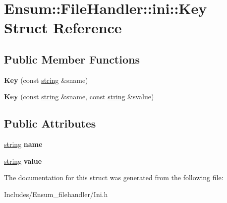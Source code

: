 \hypertarget{struct_ensum_1_1_file_handler_1_1ini_1_1_key}{}\section{Ensum\+:\+:File\+Handler\+:\+:ini\+:\+:Key Struct Reference}
\label{struct_ensum_1_1_file_handler_1_1ini_1_1_key}
\subsection*{Public Member Functions}
\begin{DoxyCompactItemize}
\item 
{\bfseries Key} (const \hyperlink{class_ensum_1_1string}{string} \&sname)\hypertarget{struct_ensum_1_1_file_handler_1_1ini_1_1_key_a10016f664c9ccb85aa8d382efac16794}{}\label{struct_ensum_1_1_file_handler_1_1ini_1_1_key_a10016f664c9ccb85aa8d382efac16794}

\item 
{\bfseries Key} (const \hyperlink{class_ensum_1_1string}{string} \&sname, const \hyperlink{class_ensum_1_1string}{string} \&svalue)\hypertarget{struct_ensum_1_1_file_handler_1_1ini_1_1_key_a8485c52051e07255bdc2f9ddb68ada91}{}\label{struct_ensum_1_1_file_handler_1_1ini_1_1_key_a8485c52051e07255bdc2f9ddb68ada91}

\end{DoxyCompactItemize}
\subsection*{Public Attributes}
\begin{DoxyCompactItemize}
\item 
\hyperlink{class_ensum_1_1string}{string} {\bfseries name}\hypertarget{struct_ensum_1_1_file_handler_1_1ini_1_1_key_a9307efc046f4e0d2dde327ae9c33221b}{}\label{struct_ensum_1_1_file_handler_1_1ini_1_1_key_a9307efc046f4e0d2dde327ae9c33221b}

\item 
\hyperlink{class_ensum_1_1string}{string} {\bfseries value}\hypertarget{struct_ensum_1_1_file_handler_1_1ini_1_1_key_ae9d1f184f0deb44980c2f73196d3f75e}{}\label{struct_ensum_1_1_file_handler_1_1ini_1_1_key_ae9d1f184f0deb44980c2f73196d3f75e}

\end{DoxyCompactItemize}


The documentation for this struct was generated from the following file\+:\begin{DoxyCompactItemize}
\item 
Includes/\+Ensum\+\_\+filehandler/Ini.\+h\end{DoxyCompactItemize}
